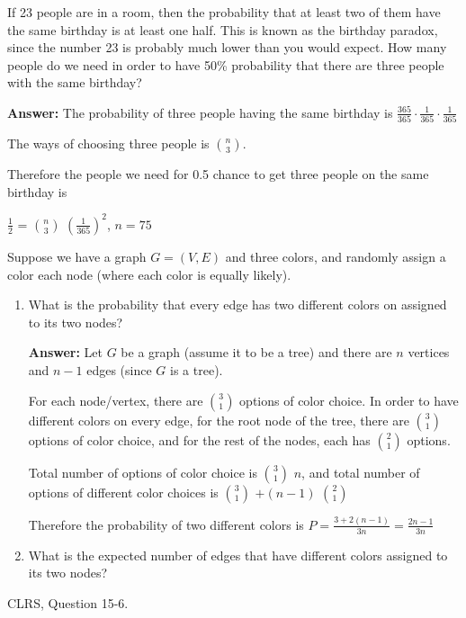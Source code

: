 \documentclass{article}
\author{Group 13: Elliott Pryor, Ben Bushnell, Shengnan Zhou}
\date{due: 18 October 2019}
\begin{document}
\nextprob
If 23 people are in a room, then the probability that at least two of them have
the same birthday is at least one half.  This is known as the birthday paradox,
since the number 23 is probably much lower than you would expect.  How many
people do we need in order to have 50\% probability that there are three people
with the same birthday?


\textbf{Answer: }  The probability of three people having the same birthday is $\frac{365}{365} \cdot \frac{1}{365} \cdot \frac{1}{365}$

The ways of choosing three people is $n\choose{3}$.

Therefore the people we need for 0.5 chance to get three people on the same birthday is 

$\frac{1}{2}$ = $n \choose 3$ $(\frac{1}{365})^2 $, $n = 75$


\nextprob
Suppose we have a graph $G=(V,E)$ and three colors, and randomly assign a color
each node (where each color is equally likely).
\begin{enumerate}
   \item What is the probability that every edge has two different colors on
        assigned to its two nodes?
        
        \textbf{Answer:} Let $G$ be a graph (assume it to be a tree) and there are $n$ vertices and $n-1$ edges (since $G$ is a tree).
        
        For each node/vertex, there are $3 \choose 1$ options of color choice. In order to have different colors on every edge, for the root node of the tree, there are $3 \choose 1$ options of color choice, and for the rest of the nodes, each has $2\choose 1$ options.
        
        Total number of options of color choice is $3\choose 1$ $n$, and total number of options of different color choices is $3\choose 1$ $+ (n-1) $ $2\choose 1$
        
        Therefore the probability of two different colors is $P = \frac{3+2(n-1)}{3n} = \frac{2n-1}{3n}$
        
    \item What is the expected number of edges that have different colors
        assigned to its two nodes?
        
        
\end{enumerate}

\nextprob
CLRS, Question 15-6.
\end{document}
